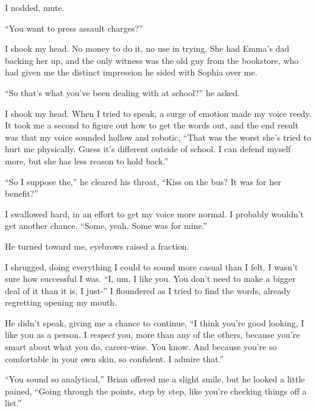 I nodded, mute.



``You want to press assault charges?''



I shook my head.  No money to do it, no use in trying.  She had Emma's dad backing her up, and the only witness was the old guy from the bookstore, who had given me the distinct impression he sided with Sophia over me.



``So that's what you've been dealing with at school?'' he asked.



I shook my head.  When I tried to speak, a surge of emotion made my voice reedy.  It took me a second to figure out how to get the words out, and the end result was that my voice sounded hollow and robotic, ``That was the worst she's tried to hurt me physically.  Guess it's different outside of school.  I can defend myself more, but she has less reason to hold back.''



``So I suppose the,'' he cleared his throat, ``Kiss on the bus?  It was for her benefit?''



I swallowed hard, in an effort to get my voice more normal.  I probably wouldn't get another chance.  ``Some, yeah.  Some was for mine.''



He turned toward me, eyebrows raised a fraction.



I shrugged, doing everything I could to sound more casual than I felt.  I wasn't sure how successful I was.  ``I, um, I like you.  You don't need to make a bigger deal of it than it is, I just-'' I floundered as I tried to find the words, already regretting opening my mouth.



He didn't speak, giving me a chance to continue, ``I think you're good looking, I like you as a person.  I \emph{respect} you, more than any of the others, because you're smart about what you do, career-wise.  You know.  And because you're so comfortable in your own skin, so confident.  I admire that.''



``You sound so analytical,'' Brian offered me a slight smile, but he looked a little pained, ``Going through the points, step by step, like you're checking things off a list.''



